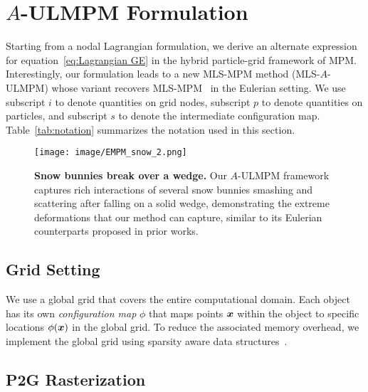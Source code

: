 \section{$A$-ULMPM Formulation}
\label{sec:A_UL_MLS_MPM}

Starting from a nodal Lagrangian formulation, we derive an alternate expression for equation~\eqref{eq:Lagrangian GE} in the hybrid particle-grid framework of MPM. 
Interestingly, our formulation leads to a new MLS-MPM method (MLS-$A$-ULMPM) whose variant recovers MLS-MPM~\cite{Hu:2018:Moving} in the Eulerian setting.  
We use subscript $i$ to denote quantities on grid nodes, subscript $p$ to denote quantities on particles, and subscript $s$ to denote the intermediate configuration map. 
Table~\ref{tab:notation} summarizes the notation used in this section.
\begin{figure*}
    \centering
    \texttt{[image: image/EMPM\_snow\_2.png]}
     \vspace{-4mm}
     \caption{\textbf{Snow bunnies break over a wedge.} 
    Our $A$-ULMPM framework captures rich interactions of several snow bunnies smashing and scattering after falling on a solid wedge, demonstrating the extreme deformations that our method can capture, similar to its Eulerian counterparts proposed in prior works.} 
    \label{fig:snow}
    \vspace{-3mm}
\end{figure*}




\subsection{Grid Setting}

We use a global grid that covers the entire computational domain. Each object has its own \emph{configuration map} $\phi$ that maps points $\boldsymbol{x}$ within the object to specific locations $\phi(\boldsymbol{x})$ in the global grid. To reduce the associated memory overhead, we implement the global grid using sparsity aware data structures~\cite{Setaluri:2014:SSP}.%

\subsection{P2G Rasterization}

